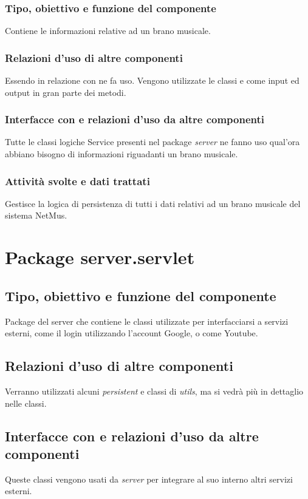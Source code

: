 \subsubsection*{Tipo, obiettivo e funzione del componente} Contiene le
informazioni relative ad un brano musicale. 
\subsubsection*{Relazioni d'uso di
altre componenti} Essendo in relazione con  ne fa uso. Vengono
utilizzate le classi  e  come input ed output
in gran parte dei metodi. 
\subsubsection*{Interfacce con e relazioni d'uso da
altre componenti} Tutte le classi logiche Service presenti nel package
\emph{server} ne fanno uso qual'ora abbiano bisogno di informazioni riguadanti
un brano musicale. 
\subsubsection*{Attivit\`a svolte e dati trattati} Gestisce
la logica di persistenza di tutti i dati relativi ad un brano musicale del
sistema NetMus.

\section{Package server.servlet}
\subsection*{Tipo, obiettivo e funzione del componente}
Package del server che contiene le classi utilizzate per interfacciarsi a
servizi esterni, come il login utilizzando l'account Google, o come Youtube.

\subsection*{Relazioni d'uso di altre componenti}
Verranno utilizzati alcuni \emph{persistent} e classi di \emph{utils}, ma
si vedr\`a pi\`u in dettaglio nelle classi.

\subsection*{Interfacce con e relazioni d'uso da altre componenti}
Queste classi vengono usati da \emph{server} per integrare al suo interno
altri servizi esterni.
